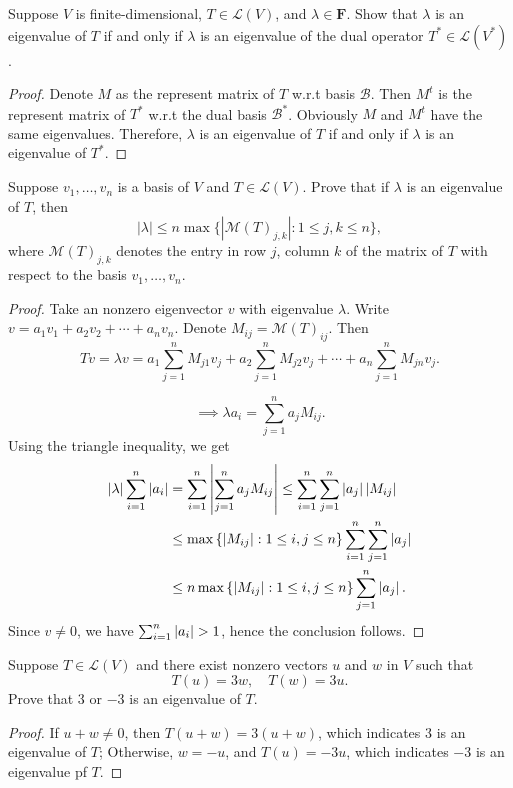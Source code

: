 \documentclass{article}
\begin{document}
\begin{problem}[5A-15]
  Suppose $V$ is finite-dimensional, $T\in\mathcal{L}(V)$, and
  $\lambda\in\mathbf{F}$. Show that $\lambda$ is an eigenvalue of $T$ if and
  only if $\lambda$ is an eigenvalue of the dual operator
  $T^*\in\mathcal{L}(V^*)$.
\end{problem}

\begin{proof}
  Denote \( M \) as the represent matrix of \( T \) w.r.t basis \( \mathcal{B  } \). Then \( M^t \) is the represent matrix of \( T^* \) w.r.t the dual basis \( \mathcal{B}^* \). Obviously \( M \) and \( M^t \)  have the same eigenvalues. Therefore, \( \lambda \) is an eigenvalue of \( T \) if and only if \( \lambda \) is an eigenvalue of \( T^* \).
\end{proof}

\begin{problem}[5A-16]
  Suppose $v_1,\ldots,v_n$ is a basis of $V$ and $T\in\mathcal{L}(V)$. Prove
  that if $\lambda$ is an eigenvalue of $T$, then
  \[
  |\lambda|\leq n\max\bigl\{|\mathcal{M}(T)_{j,k}|:1\leq j,k\leq n\bigr\},
  \]
  where $\mathcal{M}(T)_{j,k}$ denotes the entry in row $j$, column $k$ of the
  matrix of $T$ with respect to the basis $v_1,\ldots,v_n$.
\end{problem}

\begin{proof}
  Take an nonzero eigenvector \( v \) with eigenvalue \( \lambda \). Write \( v = a_1v_1 + a_2v_2 + \cdots + a_nv_n \). Denote \( M_{ij}=\mathcal{M}(T)_{ij} \). Then
  \[ Tv = \lambda v = a_1\sum_{j=1}^{n}M_{j1}v_j + a_2\sum_{j=1}^{n}M_{j2}v_j + \cdots + a_n\sum_{j=1}^{n}M_{jn}v_j. \] \par
  \[ \implies \lambda a_i=\sum_{j=1}^{n}a_{j}M_{ij}. \] 
  Using the triangle inequality, we get
  \begin{align*}
    \left|\lambda\right|\sum_{i=1}^{n}\left|a_i\right|
    &=\sum_{i=1}^{n}\left|\sum_{j=1}^{n}a_jM_{ij}\right|
    \le \sum_{i=1}^{n}\sum_{j=1}^{n}\left|a_j\right|\left|M_{ij}\right|\\
    &\le \max \left\{\left|M_{ij}\right|:1\leq i,j\leq n\right\} \sum_{i=1}^{n}\sum_{j=1}^{n}\left|a_j\right|\\
    &\le n\max \left\{\left|M_{ij}\right|:1\leq i,j\leq n\right\} \sum_{j=1}^{n}\left|a_j\right|.
  \end{align*}
  Since \( v\neq 0 \), we have \( \sum_{i=1}^{n}\abs{a_i}>1 \), hence the conclusion follows.
\end{proof}

\begin{problem}[5A-22]
  Suppose \( T\in \mathcal{L}(V) \) and there exist nonzero vectors \( u \) and \( w \) in \( V \) such that 
  \[ T(u)=3w,\quad T(w)=3u. \] 
  Prove that \( 3 \) or \( -3 \) is an eigenvalue of \( T \).
\end{problem}

\begin{proof}
  If \( u+w\neq 0 \), then \( T(u+w)=3(u+w) \), which indicates \( 3 \) is an eigenvalue of \( T \); Otherwise, \( w=-u \), and \( T(u)=-3u \), which indicates \( -3 \) is an eigenvalue pf \( T \).
\end{proof}
\end{document}
